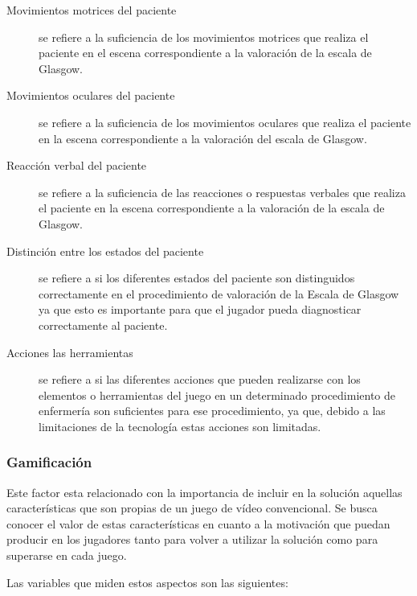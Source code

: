 \begin{description}

\item [Movimientos motrices del paciente] se refiere a la suficiencia de los
    movimientos motrices que realiza el paciente en el escena correspondiente a
    la valoración de la escala de Glasgow.

\item [Movimientos oculares del paciente] se refiere a la suficiencia de los
    movimientos oculares que realiza el paciente en la escena correspondiente a
    la valoración del escala de Glasgow.

\item [Reacción verbal del paciente] se refiere a la suficiencia de las
    reacciones o respuestas verbales que realiza el paciente en la escena
    correspondiente a la valoración de la escala de Glasgow.

\item[Distinción entre los estados del paciente] se refiere a si los diferentes
    estados del paciente son distinguidos correctamente en el procedimiento de
    valoración de la Escala de Glasgow ya que esto es importante para que el
    jugador pueda diagnosticar correctamente al paciente.

\item[Acciones las herramientas] se refiere a si las diferentes acciones que
    pueden realizarse con los elementos o herramientas del juego en un
    determinado procedimiento de enfermería son suficientes para ese
    procedimiento, ya que, debido a las limitaciones de la tecnología estas
    acciones son limitadas.

\end{description}

\subsubsection{Gamificación}
\label{sec:sub_gamificacion}

Este factor esta relacionado con la importancia de incluir en la solución
aquellas características que son propias de un juego de vídeo convencional. Se
busca conocer el valor de estas características en cuanto a la motivación que
puedan producir en los jugadores tanto para volver a utilizar la solución como
para superarse en cada juego.

Las variables que miden estos aspectos son las siguientes:


